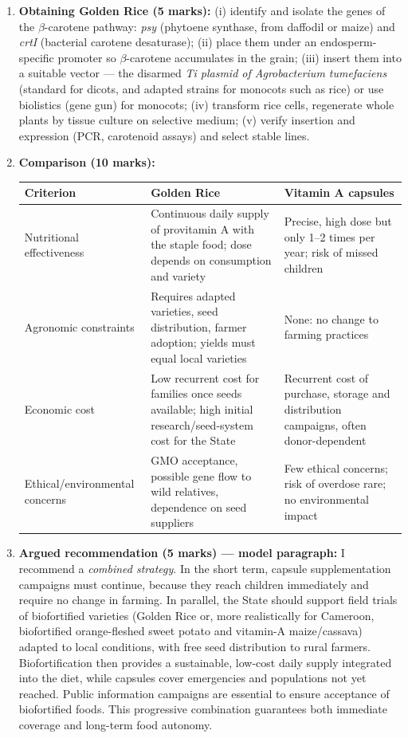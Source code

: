 \documentclass[11pt]{article}
\begin{document}
\begin{corrige}
\begin{enumerate}
\item \textbf{Obtaining Golden Rice (5 marks):} (i) identify and isolate the genes of the $\beta$-carotene pathway: \emph{psy} (phytoene synthase, from daffodil or maize) and \emph{crtI} (bacterial carotene desaturase); (ii) place them under an endosperm-specific promoter so $\beta$-carotene accumulates in the grain; (iii) insert them into a suitable vector — the disarmed \emph{Ti plasmid of Agrobacterium tumefaciens} (standard for dicots, and adapted strains for monocots such as rice) or use biolistics (gene gun) for monocots; (iv) transform rice cells, regenerate whole plants by tissue culture on selective medium; (v) verify insertion and expression (PCR, carotenoid assays) and select stable lines.
\item \textbf{Comparison (10 marks):}
\begin{center}
\begin{tabularx}{\linewidth}{|l|X|X|}
\hline
\rowcolor{popblueL} Criterion & Golden Rice & Vitamin A capsules \\
\hline Nutritional effectiveness & Continuous daily supply of provitamin A with the staple food; dose depends on consumption and variety & Precise, high dose but only 1--2 times per year; risk of missed children \\
\hline Agronomic constraints & Requires adapted varieties, seed distribution, farmer adoption; yields must equal local varieties & None: no change to farming practices \\
\hline Economic cost & Low recurrent cost for families once seeds available; high initial research/seed-system cost for the State & Recurrent cost of purchase, storage and distribution campaigns, often donor-dependent \\
\hline Ethical/environmental concerns & GMO acceptance, possible gene flow to wild relatives, dependence on seed suppliers & Few ethical concerns; risk of overdose rare; no environmental impact \\
\hline
\end{tabularx}
\end{center}
\item \textbf{Argued recommendation (5 marks) — model paragraph:} I recommend a \emph{combined strategy}. In the short term, capsule supplementation campaigns must continue, because they reach children immediately and require no change in farming. In parallel, the State should support field trials of biofortified varieties (Golden Rice or, more realistically for Cameroon, biofortified orange-fleshed sweet potato and vitamin-A maize/cassava) adapted to local conditions, with free seed distribution to rural farmers. Biofortification then provides a sustainable, low-cost daily supply integrated into the diet, while capsules cover emergencies and populations not yet reached. Public information campaigns are essential to ensure acceptance of biofortified foods. This progressive combination guarantees both immediate coverage and long-term food autonomy.
\end{enumerate}
\end{corrige}
\end{document}
